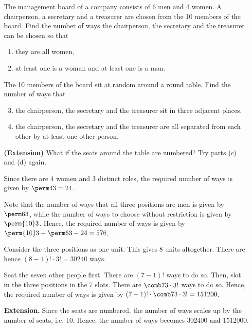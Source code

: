 \begin{problem}
    The management board of a company consists of 6 men and 4 women. A chairperson, a secretary and a treasurer are chosen from the 10 members of the board. Find the number of ways the chairperson, the secretary and the treasurer can be chosen so that
    \begin{enumerate}
        \item they are all women,
        \item at least one is a woman and at least one is a man.
    \end{enumerate}

    The 10 members of the board sit at random around a round table. Find the number of ways that
    \begin{enumerate}
        \setcounter{enumi}{2}
        \item the chairperson, the secretary and the treasurer sit in three adjacent places.
        \item the chairperson, the secretary and the treasurer are all separated from each other by at least one other person.
    \end{enumerate}

    \textbf{(Extension)} What if the seats around the table are numbered? Try parts (c) and (d) again.
\end{problem}
\begin{solution}
    \begin{ppart}
        Since there are 4 women and 3 distinct roles, the required number of ways is given by $\perm43 = 24$.
    \end{ppart}
    \begin{ppart}
        Note that the number of ways that all three positions are men is given by $\perm63$, while the number of ways to choose without restriction is given by $\perm{10}3$. Hence, the required number of ways is given by $\perm{10}3 - \perm63 - 24 = 576$.
    \end{ppart}
    \begin{ppart}
        Consider the three positions as one unit. This gives 8 units altogether. There are hence $(8-1)! \cdot 3! = 30240$ ways.
    \end{ppart}
    \begin{ppart}
        Seat the seven other people first. There are $(7-1)!$ ways to do so. Then, slot in the three positions in the 7 slots. There are $\comb73 \cdot 3!$ ways to do so. Hence, the required number of ways is given by $(7-1)! \cdot \comb73 \cdot 3! = 151200$.
    \end{ppart}

    \medskip

    \noindent\textbf{\sffamily Extension.} Since the seats are numbered, the number of ways scales up by the number of seats, i.e. 10. Hence, the number of ways becomes $302400$ and $1512000$.
\end{solution}